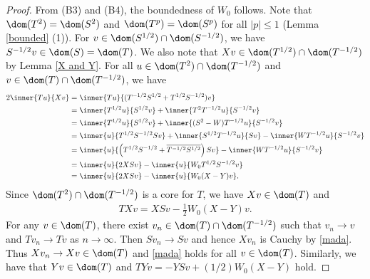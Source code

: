 \documentclass[12pt,draft]{article}
\theoremstyle{plain}
\numberwithin{equation}{section}
\theoremstyle{remark}
\begin{document}
\begin{proof}
From (B3) and (B4), the boundedness of $W_0$ follows.
Note that $\dom(T^2)=\dom(S^2)$ and $\dom(T^p)=\dom(S^p)$ for all $|p|\leq 1$ (Lemma \ref{bounded} (1)).
For $v\in\dom(S^{1/2})\cap \dom(S^{-1/2})$, we have $S^{-1/2}v \in \dom(S)=\dom(T)$.
We also note that $Xv\in\dom(T^{1/2})\cap\dom(T^{-1/2})$ by Lemma \ref{X and Y}. 
For all $u\in \dom(T^2)\cap\dom(T^{-1/2})$ and $v \in \dom(T)\cap\dom(T^{-1/2})$, we have
\begin{align*}
  2\inner{Tu}{Xv} 
& = \inner{Tu}{(T^{-1/2}S^{1/2}+T^{1/2}S^{-1/2})v} \\
& = \inner{T^{1/2}u}{S^{1/2}v} + \inner{T^2T^{-1/2}u}{S^{-1/2}v} \\
& = \inner{T^{1/2}u}{S^{1/2}v} + \inner{(S^2-W)T^{-1/2}u}{S^{-1/2}v} \\
& = \inner{u}{T^{1/2}S^{-1/2}Sv} + \inner{S^{1/2}T^{-1/2}u}{Sv} - \inner{WT^{-1/2}u}{S^{-1/2}v} \\
& = \inner{u}{\left(T^{1/2}S^{-1/2}+\overline{T^{-1/2}S^{1/2}}\right)Sv} - \inner{WT^{-1/2}u}{S^{-1/2}v} \\
& = \inner{u}{2XSv} - \inner{u}{W_0T^{1/2}S^{-1/2}v} \\
& = \inner{u}{2XSv} - \inner{u}{W_0(X-Y)v}.
\end{align*}
Since $\dom(T^2)\cap\dom(T^{-1/2})$ is a core for $T$, we have $Xv\in\dom(T)$ and 
\begin{align}
  TXv = XSv - \frac{1}{2}W_0(X-Y)v.  \label{mada}
\end{align}
For any $v\in\dom(T)$, there exist $v_n \in \dom(T)\cap \dom(T^{-1/2})$ such that 
$v_n\to v$ and $Tv_n\to Tv$ as $n\to\infty$. Then $Sv_n\to Sv$ and hence
$Xv_n$ is Cauchy by \eqref{mada}. Thus $Xv_n\to Xv\in\dom(T)$ and
\eqref{mada} holds for all $v\in\dom(T)$.
Similarly, we have that $Yv\in\dom(T)$ and $TYv=-YSv+(1/2)W_0(X-Y)$ hold.
\end{proof}
\end{document}
